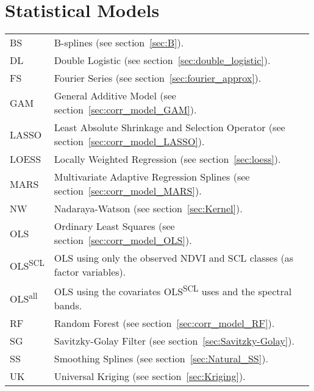 \section*{Statistical Models}\vspace{-0.3cm}
\begin{longtable}{p{0.12\linewidth} p{0.87\linewidth}}
	BS & B-splines (see section~\ref{sec:B}).\\
	DL & Double Logistic (see section~\ref{sec:double_logistic}).\\
	FS & Fourier Series (see section~\ref{sec:fourier_approx}).\\
	GAM & General Additive Model (see section~\ref{sec:corr_model_GAM}).\\
	LASSO & Least Absolute Shrinkage and Selection Operator (see section~\ref{sec:corr_model_LASSO}).\\
	LOESS & Locally Weighted Regression (see section~\ref{sec:loess}).\\
	MARS & Multivariate Adaptive Regression Splines (see section~\ref{sec:corr_model_MARS}).\\
	NW & Nadaraya-Watson (see section~\ref{sec:Kernel}).\\
	OLS & Ordinary Least Squares (see section~\ref{sec:corr_model_OLS}).\\
	OLS\textsuperscript{SCL} & OLS using only the observed NDVI and SCL classes (as factor variables).\\
	OLS\textsuperscript{all} & OLS using the covariates OLS\textsuperscript{SCL} uses and the spectral bands.\\
	RF & Random Forest (see section~\ref{sec:corr_model_RF}).\\
	SG & Savitzky-Golay Filter (see section~\ref{sec:Savitzky-Golay}).\\
	SS & Smoothing Splines (see section~\ref{sec:Natural_SS}).\\
	UK & Universal Kriging (see section~\ref{sec:Kriging}).\\
\end{longtable} \renewcommand{\arraystretch}{1}












